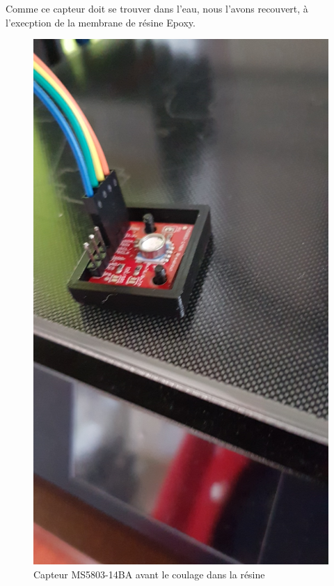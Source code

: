 \documentclass[a4paper,11pt]{report}
\begin{document}
			Comme ce capteur doit se trouver dans l'eau, nous l'avons recouvert, à l'execption de la membrane de résine Epoxy. \newline
			
				\begin{figure}[!h]
					\begin{center}
						\includegraphics[scale=0.2]{Photos/Capture40.jpeg}
						\caption{Capteur MS5803-14BA avant le coulage dans la résine}
					\end{center}
				\end{figure}
				\newline
			
\end{document}
